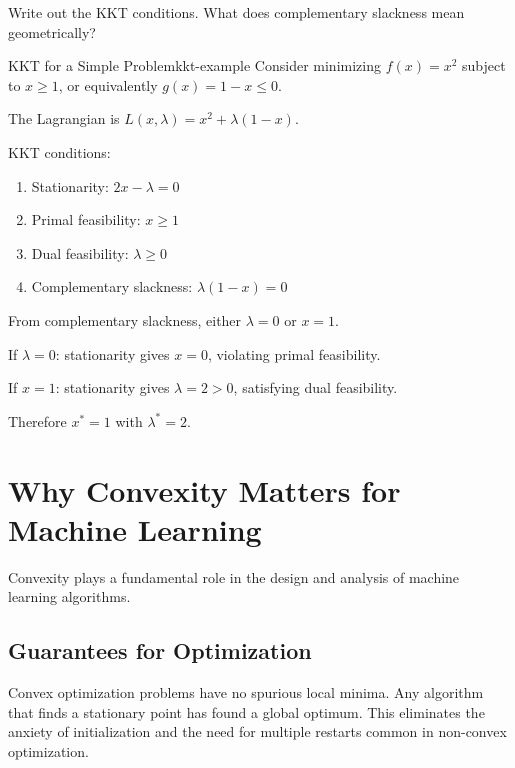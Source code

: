 \documentclass[../../main.tex]{subfiles}
\begin{document}
\begin{checkpoint}
Write out the KKT conditions. What does complementary slackness mean geometrically?
\end{checkpoint}

\begin{example}{KKT for a Simple Problem}{kkt-example}
Consider minimizing $f(x) = x^2$ subject to $x \geq 1$, or equivalently $g(x) = 1 - x \leq 0$.

The Lagrangian is $L(x, \lambda) = x^2 + \lambda(1 - x)$.

KKT conditions:
\begin{enumerate}
    \item Stationarity: $2x - \lambda = 0$
    \item Primal feasibility: $x \geq 1$
    \item Dual feasibility: $\lambda \geq 0$
    \item Complementary slackness: $\lambda(1 - x) = 0$
\end{enumerate}

From complementary slackness, either $\lambda = 0$ or $x = 1$.

If $\lambda = 0$: stationarity gives $x = 0$, violating primal feasibility.

If $x = 1$: stationarity gives $\lambda = 2 > 0$, satisfying dual feasibility.

Therefore $x^* = 1$ with $\lambda^* = 2$.
\end{example}

\section{Why Convexity Matters for Machine Learning}
\label{sec:convex-ml}

Convexity plays a fundamental role in the design and analysis of machine learning algorithms.

\subsection{Guarantees for Optimization}

\begin{principle}
Convex optimization problems have no spurious local minima. Any algorithm that finds a stationary point has found a global optimum. This eliminates the anxiety of initialization and the need for multiple restarts common in non-convex optimization.
\end{principle}
\end{document}
